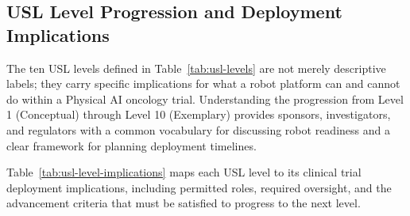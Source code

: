 \subsection{USL Level Progression and Deployment Implications}
\label{subsec:usl-level-progression}

The ten USL levels defined in Table~\ref{tab:usl-levels} are not merely
descriptive labels; they carry specific implications for what a robot platform
can and cannot do within a Physical AI oncology trial. Understanding the
progression from Level 1 (Conceptual) through Level 10 (Exemplary) provides
sponsors, investigators, and regulators with a common vocabulary for discussing
robot readiness and a clear framework for planning deployment timelines.

Table~\ref{tab:usl-level-implications} maps each USL level to its clinical
trial deployment implications, including permitted roles, required oversight,
and the advancement criteria that must be satisfied to progress to the next
level.

